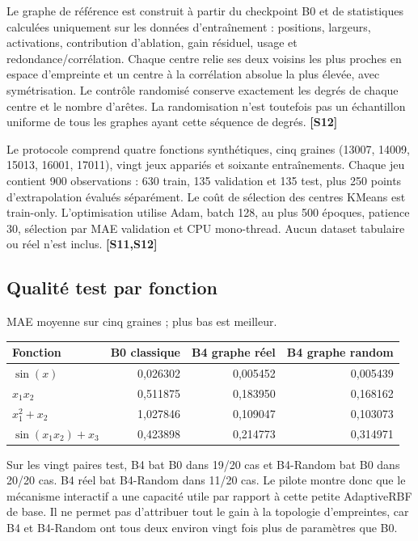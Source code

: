 \documentclass[11pt,a4paper]{article}
\newcommand{\src}[1]{\textbf{[#1]}}
\begin{document}
Le graphe de référence est construit à partir du checkpoint B0 et de statistiques calculées uniquement sur les données d'entraînement : positions, largeurs, activations, contribution d'ablation, gain résiduel, usage et redondance/corrélation. Chaque centre relie ses deux voisins les plus proches en espace d'empreinte et un centre à la corrélation absolue la plus élevée, avec symétrisation. Le contrôle randomisé conserve exactement les degrés de chaque centre et le nombre d'arêtes. La randomisation n'est toutefois pas un échantillon uniforme de tous les graphes ayant cette séquence de degrés. \src{S12}

Le protocole comprend quatre fonctions synthétiques, cinq graines (13007, 14009, 15013, 16001, 17011), vingt jeux appariés et soixante entraînements. Chaque jeu contient 900 observations : 630 train, 135 validation et 135 test, plus 250 points d'extrapolation évalués séparément. Le coût de sélection des centres KMeans est train-only. L'optimisation utilise Adam, batch 128, au plus 500 époques, patience 30, sélection par MAE validation et CPU mono-thread. Aucun dataset tabulaire ou réel n'est inclus. \src{S11,S12}

\subsection{Qualité test par fonction}

MAE moyenne sur cinq graines ; plus bas est meilleur.
\begin{center}
\small
\begin{tabular}{lrrr}
\toprule
Fonction & B0 classique & B4 graphe réel & B4 graphe random\\
\midrule
$\sin(x)$ & 0,026302 & 0,005452 & 0,005439\\
$x_1x_2$ & 0,511875 & 0,183950 & 0,168162\\
$x_1^2+x_2$ & 1,027846 & 0,109047 & 0,103073\\
$\sin(x_1x_2)+x_3$ & 0,423898 & 0,214773 & 0,314971\\
\bottomrule
\end{tabular}
\end{center}

Sur les vingt paires test, B4 bat B0 dans 19/20 cas et B4-Random bat B0 dans 20/20 cas. B4 réel bat B4-Random dans 11/20 cas. Le pilote montre donc que le mécanisme interactif a une capacité utile par rapport à cette petite AdaptiveRBF de base. Il ne permet pas d'attribuer tout le gain à la topologie d'empreintes, car B4 et B4-Random ont tous deux environ vingt fois plus de paramètres que B0.
\end{document}
